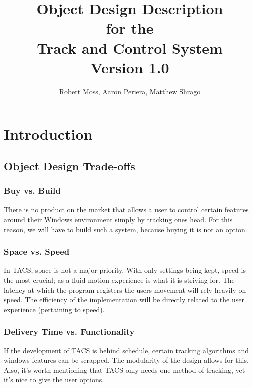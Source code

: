 \documentclass[titlepage]{article}
\begin{document}
\title{
\textbf{
Object Design Description}
\protect\\
for the
\protect\\
\textbf{
Track and Control System}
\protect\\
{\small Version 1.0}}

\author{Robert Moss, Aaron Periera, Matthew Shrago}
\maketitle

\newpage
\tableofcontents{} 
\newpage

\section{Introduction}

\subsection{Object Design Trade-offs}

\subsubsection{Buy vs. Build}
There is no product on the market that allows a user to control certain features around their Windows environment simply by tracking ones head. For this reason, we will have to build such a system, because buying it is not an option.
	

\subsubsection{Space vs. Speed}
In TACS, space is not a major priority. With only settings being kept, speed is the most crucial; as a fluid motion experience is what it is striving for. The latency at which the program registers the users movement will rely heavily on speed. The efficiency of the implementation will be directly related to the user experience (pertaining to speed).

\subsubsection{Delivery Time vs. Functionality}
If the development of TACS is behind schedule, certain tracking algorithms and windows features can be scrapped. The modularity of the design allows for this. Also, it's worth mentioning that TACS only needs one method of tracking, yet it's nice to give the user options.
\end{document}
